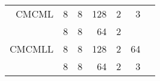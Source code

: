 \begin{table*}[!ht]
\begin{tabular}{r|r|r|r|r|r|r}
CMCML  & 8             & 8      & 128    & 2            & 3      &                 \\       
       & 8             & 8      & 64     & 2            &        &                 \\ \hline
CMCMLL & 8             & 8      & 128    & 2            & 64     &                 \\       
       & 8             & 8      & 64     & 2            & 3      &                 \\ \hline

\end{tabular}
\end{table*}
